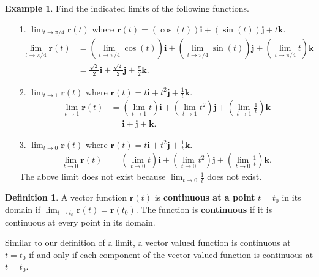 \documentclass[12pt, letter]{article}
\theoremstyle{plain}
\numberwithin{theorem}{section}
\theoremstyle{definition}
\newtheorem{definition}[theorem]{Definition}
\newtheorem{example}[theorem]{Example}
\begin{document}
\begin{example}
Find the indicated limits of the following functions.\\
\begin{itemize}
\item[1.] $\lim_{t \to \pi/4} \bm{r}(t)$ where $\bm{r}(t) = (\cos(t))\bm{i}+(\sin(t))\bm{j} + t\bm{k}$.
\begin{align*}
\lim_{t \to \pi/4} \bm{r}(t) &= \left(\lim_{t \to \pi/4} \cos(t)\right) \bm{i} + \left(\lim_{t \to \pi/4} \sin(t)\right)\bm{j} + \left(\lim_{t \to \pi/4} t\right)\bm{k}\\
&= \frac{\sqrt{2}}{2} \bm{i} + \frac{\sqrt{2}}{2} \bm{j} + \frac{\pi}{2} \bm{k}.
\end{align*}
\item[2.] $\lim_{t \to 1} \bm{r}(t)$ where $\bm{r}(t) = t \bm{i}+t^2\bm{j} + \frac{1}{t} \bm{k}$.
\begin{align*}
\lim_{t \to 1} \bm{r}(t) &= \left(\lim_{t \to 1} t \right) \bm{i} + \left(\lim_{t \to 1} t^2 \right)\bm{j} + \left(\lim_{t \to 1} \frac{1}{t}\right)\bm{k}\\
&= \bm{i} + \bm{j} + \bm{k}.
\end{align*}
\item[3.] $\lim_{t \to 0} \bm{r}(t)$ where $\bm{r}(t) = t \bm{i}+t^2\bm{j} + \frac{1}{t} \bm{k}$.
\begin{align*}
\lim_{t \to 0} \bm{r}(t) &= \left(\lim_{t \to 0} t \right) \bm{i} + \left(\lim_{t \to 0} t^2 \right)\bm{j} + \left(\lim_{t \to 0} \frac{1}{t}\right)\bm{k}.
\end{align*}
The above limit does not exist because $\lim_{t\to 0} \frac{1}{t}$ does not exist.
\end{itemize}
\end{example}

\bigskip

\hrulefill

\bigskip

\begin{definition}
A vector function $\bm{r}(t)$ is \textbf{continuous at a point} $t=t_0$ in its domain if $\lim_{t\to t_0} \bm{r}(t) = \bm{r}(t_0)$. The function is \textbf{continuous} if it is continuous at every point in its domain.
\end{definition}

\bigskip

Similar to our definition of a limit, a vector valued function is continuous at $t=t_0$ if and only if each component of the vector valued function is continuous at $t=t_0$.
\end{document}
